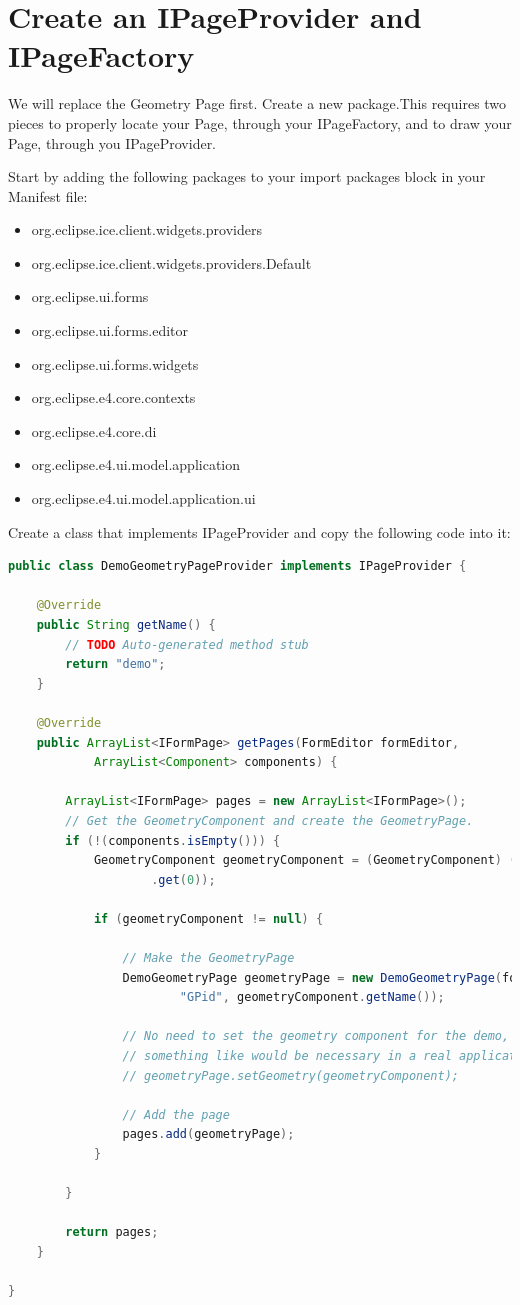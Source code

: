 \documentclass{article}
\begin{document}
\section{Create an IPageProvider and IPageFactory}

We will replace the Geometry Page first. Create a new package.This requires two
pieces to properly locate your Page, through your IPageFactory, and to draw
your Page, through you IPageProvider.

Start by adding the following packages to your import packages block in your
Manifest file:
\begin{itemize}
  \item org.eclipse.ice.client.widgets.providers
  \item org.eclipse.ice.client.widgets.providers.Default
  \item org.eclipse.ui.forms
  \item org.eclipse.ui.forms.editor
  \item org.eclipse.ui.forms.widgets
  \item org.eclipse.e4.core.contexts
  \item org.eclipse.e4.core.di
  \item org.eclipse.e4.ui.model.application
  \item org.eclipse.e4.ui.model.application.ui
\end{itemize}

Create a class that implements IPageProvider and copy the following code into
it:

\begin{lstlisting}[language=java]
public class DemoGeometryPageProvider implements IPageProvider {

    @Override
    public String getName() {
        // TODO Auto-generated method stub
        return "demo";
    }

    @Override
    public ArrayList<IFormPage> getPages(FormEditor formEditor,
            ArrayList<Component> components) {

        ArrayList<IFormPage> pages = new ArrayList<IFormPage>();
        // Get the GeometryComponent and create the GeometryPage.
        if (!(components.isEmpty())) {
            GeometryComponent geometryComponent = (GeometryComponent) (components
                    .get(0));

            if (geometryComponent != null) {

                // Make the GeometryPage
                DemoGeometryPage geometryPage = new DemoGeometryPage(formEditor,
                        "GPid", geometryComponent.getName());

                // No need to set the geometry component for the demo, but
                // something like would be necessary in a real application.
                // geometryPage.setGeometry(geometryComponent);

                // Add the page
                pages.add(geometryPage);
            }

        }

        return pages;
    }

}
\end{lstlisting}
\end{document}
